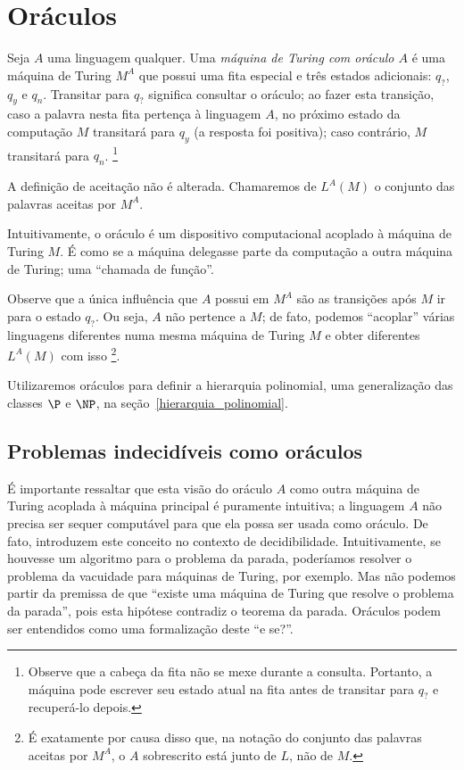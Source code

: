 \section{Oráculos}

\begin{definition}
    Seja $A$ uma linguagem qualquer.
    Uma \emph{máquina de Turing com oráculo $A$}
    é uma máquina de Turing $M^A$ que possui uma fita especial
    e três estados adicionais: $q_?$, $q_y$ e $q_n$.
    Transitar para $q_?$ significa consultar o oráculo;
    ao fazer esta transição,
    caso a palavra nesta fita pertença à linguagem $A$,
    no próximo estado da computação $M$ transitará para $q_y$
    (a resposta foi positiva);
    caso contrário, $M$ transitará para $q_n$.
    \footnote{
        Observe que a cabeça da fita não se mexe durante a consulta.
        Portanto, a máquina pode escrever seu estado atual na fita
        antes de transitar para $q_?$ e recuperá-lo depois.
    }

    A definição de aceitação não é alterada.
    Chamaremos de $L^A(M)$ o conjunto das palavras aceitas por $M^A$.
\end{definition}

Intuitivamente, o oráculo é um dispositivo computacional
acoplado à máquina de Turing $M$.
É como se a máquina delegasse parte da computação
a outra máquina de Turing;
uma ``chamada de função''.

Observe que a única influência que $A$ possui em $M^A$
são as transições após $M$ ir para o estado $q_?$.
Ou seja, $A$ não pertence a $M$;
de fato, podemos ``acoplar'' várias linguagens diferentes
numa mesma máquina de Turing $M$
e obter diferentes $L^A(M)$ com isso%
\footnote{
    É exatamente por causa disso que,
    na notação do conjunto das palavras aceitas por $M^A$,
    o $A$ sobrescrito está junto de $L$, não de $M$.
}.

Utilizaremos oráculos para definir a hierarquia polinomial,
uma generalização das classes $\P$ e $\NP$,
na seção~\ref{hierarquia_polinomial}.

\subsection{Problemas indecidíveis como oráculos}

É importante ressaltar que esta visão do oráculo $A$
como outra máquina de Turing acoplada à máquina principal
é puramente intuitiva;
a linguagem $A$ não precisa ser sequer computável
para que ela possa ser usada como oráculo.
De fato, 
introduzem este conceito no contexto de decidibilidade.
Intuitivamente, se houvesse um algoritmo para o problema da parada,
poderíamos resolver o problema da vacuidade para máquinas de Turing,
por exemplo.
Mas não podemos partir da premissa de que
``existe uma máquina de Turing que resolve o problema da parada'',
pois esta hipótese contradiz o teorema da parada.
Oráculos podem ser entendidos como uma formalização deste ``e se?''.

